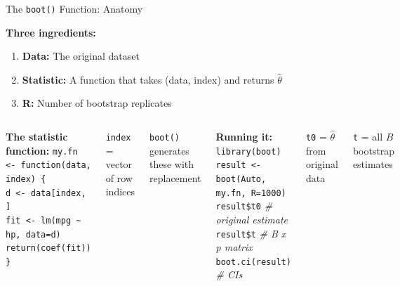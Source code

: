 \documentclass[aspectratio=169, 11pt]{beamer}
\begin{document}
\begin{frame}{The \texttt{boot()} Function: Anatomy}

\textbf{Three ingredients:}

\begin{enumerate}
  \item \textbf{Data:} The original dataset
  \item \textbf{Statistic:} A function that takes (data, index) and returns $\hat{\theta}$
  \item \textbf{R:} Number of bootstrap replicates
\end{enumerate}

\vspace{0.3em}
\begin{columns}
\textbf{The statistic function:}
\footnotesize
\texttt{my.fn <- function(data, index) \{}\\
\texttt{\quad d <- data[index, ]}\\
\texttt{\quad fit <- lm(mpg \textasciitilde{} hp, data=d)}\\
\texttt{\quad return(coef(fit))}\\
\texttt{\}}
\normalsize

\vspace{0.3em}
\texttt{index} = vector of row indices

\texttt{boot()} generates these with replacement

\textbf{Running it:}
\footnotesize
\texttt{library(boot)}\\
\texttt{result <- boot(Auto, my.fn, R=1000)}\\
\texttt{result\$t0}  \textit{\# original estimate}\\
\texttt{result\$t}   \textit{\# B x p matrix}\\
\texttt{boot.ci(result)}  \textit{\# CIs}
\normalsize

\vspace{0.3em}
\texttt{t0} = $\hat{\theta}$ from original data

\texttt{t} = all $B$ bootstrap estimates
\end{columns}
\end{frame}
\end{document}
